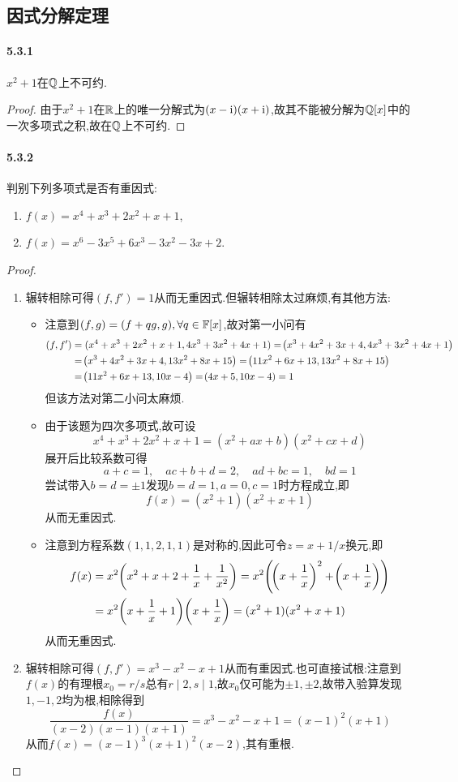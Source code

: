 \documentclass[11pt]{article}
\begin{document}
\newpage
\subsection{因式分解定理}
\paragraph{5.3.1}$x^2+1$在$\mathbb{Q}$上不可约.
\begin{proof}
    由于$x^2+1$在$\mathbb{R}$上的唯一分解式为$(x-\mathrm{i})(x+\mathrm{i})$,故其不能被分解为$\mathbb{Q}[x]$中的一次多项式之积,故在$\mathbb{Q}$上不可约.
\end{proof}
\paragraph{5.3.2}判别下列多项式是否有重因式:
\begin{enumerate}
    \item $f(x)=x^4+x^3+2x^2+x+1$,
    \item $f(x)=x^6-3x^5+6x^3-3x^2-3x+2$.
\end{enumerate}
\begin{proof}
    \begin{enumerate}
        \item 辗转相除可得$(f,f')=1$从而无重因式.但辗转相除太过麻烦,有其他方法:
        \begin{itemize}
            \item 注意到$(f,g)=(f+qg,g), \forall q\in \mathbb{F}[x]$,故对第一小问有
        $$\begin{aligned}
            (f,f')&=(x^4+x^3+2x^2+x+1,4x^3+3x^2+4x+1)=\!\left(x^3+4x^2+3x+4,4x^3+3x^2+4x+1\right)\\
            &=\!\left(x^3+4x^2+3x+4,13x^2+8x+15\right)=\!\left(11x^2+6x+13,13x^2+8x+15\right)\\
            &=\!\left(11x^2+6x+13,10x-4\right)=\!\left(4 x + 5,10x-4\right)=1
        \end{aligned}$$
        但该方法对第二小问太麻烦.
        \item 由于该题为四次多项式,故可设
        $$x^4+x^3+2x^2+x+1=(x^2+ax+b)(x^2+cx+d)$$
        展开后比较系数可得
        $$a+c=1,\quad ac+b+d=2,\quad ad+bc=1,\quad bd=1$$
        尝试带入$b=d=\pm 1$发现$b=d=1, a=0,c=1$时方程成立,即
        $$f(x)=(x^2+1)(x^2+x+1)$$
        从而无重因式.
        \item 注意到方程系数$(1,1,2,1,1)$是对称的,因此可令$z=x+1/x$换元,即
        $$\begin{aligned}
            f(x)&=x^2\!\left(x^2+x+2+\frac{1}{x}+\frac{1}{x^2}\right)=x^2\!\left(\!\left(x+\frac{1}{x}\right)^2+\!\left(x+\frac{1}{x}\right)\right)\\
            &=x^2\!\left(x+\frac{1}{x}+1\right)\!\left(x+\frac{1}{x}\right)=(x^2+1)(x^2+x+1)\\
        \end{aligned}$$
        从而无重因式.
        \end{itemize}
        \item 辗转相除可得$(f,f')=x^3- x^2- x+1$从而有重因式.也可直接试根:注意到$f(x)$的有理根$x_0=r/s$总有$r\mid 2, s\mid 1$,故$x_0$仅可能为$\pm 1, \pm 2$,故带入验算发现$1,-1,2$均为根,相除得到
        $$\frac{f(x)}{(x-2)(x-1)(x+1)}=x^3-x^2-x+1=(x-1)^2 (x+1)$$
        从而$f(x)=(x-1)^3(x+1)^2(x-2)$,其有重根.
    \end{enumerate}
\end{proof}
\end{document}
